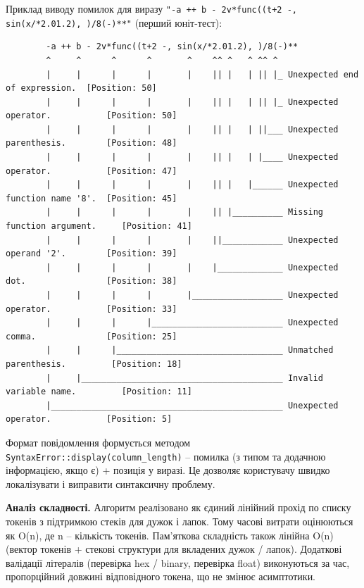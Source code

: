 \documentclass[14pt, a4paper]{extreport}
\begin{document}
	Приклад виводу помилок для виразу
	\texttt{"-a ++ b - 2v*func((t+2 -, sin(x/*2.01.2), )/8(-)**"} (перший юніт-тест):
	\begin{lstlisting}
		-a ++ b - 2v*func((t+2 -, sin(x/*2.01.2), )/8(-)**
		^     ^      ^      ^       ^    ^^ ^   ^ ^^ ^
		|     |      |      |       |    || |   | || |_ Unexpected end of expression.  [Position: 50]
		|     |      |      |       |    || |   | || |_ Unexpected operator.           [Position: 50]
		|     |      |      |       |    || |   | ||___ Unexpected parenthesis.        [Position: 48]
		|     |      |      |       |    || |   | |____ Unexpected operator.           [Position: 47]
		|     |      |      |       |    || |   |______ Unexpected function name '8'.  [Position: 45]
		|     |      |      |       |    || |__________ Missing function argument.     [Position: 41]
		|     |      |      |       |    ||____________ Unexpected operand '2'.        [Position: 39]
		|     |      |      |       |    |_____________ Unexpected dot.                [Position: 38]
		|     |      |      |       |__________________ Unexpected operator.           [Position: 33]
		|     |      |      |__________________________ Unexpected comma.              [Position: 25]
		|     |      |_________________________________ Unmatched parenthesis.         [Position: 18]
		|     |________________________________________ Invalid variable name.         [Position: 11]
		|______________________________________________ Unexpected operator.           [Position: 5]
	\end{lstlisting}
	
	Формат повідомлення формується методом \texttt{SyntaxError::display(column\_length)} -- помилка (з типом та додачною інформацією, якщо є) + позиція у виразі. Це дозволяє користувачу швидко локалізувати і виправити синтаксичну проблему.
	
	\bigskip
	
	\textbf{Аналіз складності.} Алгоритм реалізовано як єдиний лінійний прохід по списку токенів з підтримкою стеків для дужок і лапок. Тому часові витрати оцінюються як 
	O(n), де  n -- кількість токенів. Пам'яткова складність також лінійна O(n) (вектор токенів + стекові структури для вкладених дужок / лапок). Додаткові валідації літералів (перевірка hex / binary, перевірка float) виконуються за час, пропорційний довжині відповідного токена, що не змінює асимптотики.
	
	\bigskip
	
\end{document}
